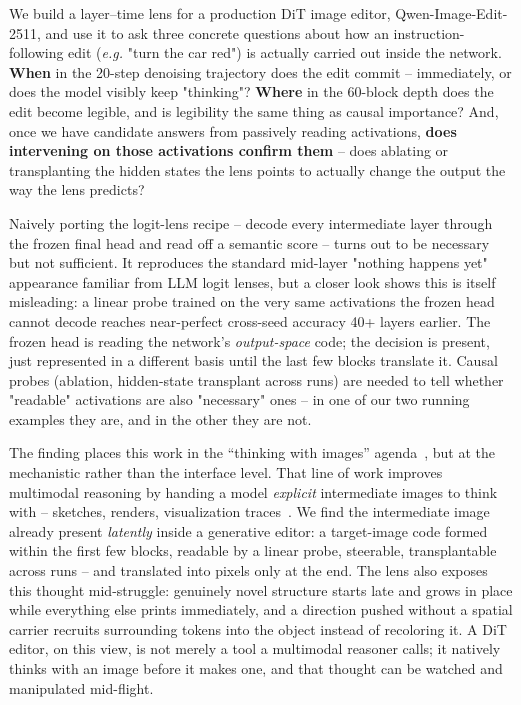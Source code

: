 \documentclass[10pt,twocolumn]{article}
\newcommand{\model}{Qwen-Image-Edit-2511}
\newcommand{\eg}{\emph{e.g.}}
\begin{document}
We build a layer--time lens for a production DiT image editor,
\model{}, and use it to ask three concrete questions about how an
instruction-following edit (\eg{} "turn the car red") is actually carried
out inside the network. \textbf{When} in the 20-step denoising trajectory
does the edit commit -- immediately, or does the model visibly keep
"thinking"? \textbf{Where} in the 60-block depth does the edit become
legible, and is legibility the same thing as causal importance?  And,
once we have candidate answers from passively reading activations,
\textbf{does intervening on those activations confirm them} -- does
ablating or transplanting the hidden states the lens points to actually
change the output the way the lens predicts?

Naively porting the logit-lens recipe -- decode every intermediate layer
through the frozen final head and read off a semantic score -- turns out
to be necessary but not sufficient. It reproduces the standard mid-layer
"nothing happens yet" appearance familiar from LLM logit lenses, but a
closer look shows this is itself misleading: a linear probe trained on
the very same activations the frozen head cannot decode reaches near-perfect
cross-seed accuracy 40+ layers earlier. The frozen head is reading the
network's \emph{output-space} code; the decision is present, just
represented in a different basis until the last few blocks translate it.
Causal probes (ablation, hidden-state transplant across runs) are needed
to tell whether "readable" activations are also "necessary" ones -- in
one of our two running examples they are, and in the other they are not.

The finding places this work in the ``thinking with
images'' agenda~\citep{su2025thinkingsurvey}, but at the mechanistic
rather than the interface level. That line of work improves multimodal
reasoning by handing a model \emph{explicit} intermediate images to
think with -- sketches, renders, visualization
traces~\citep{hu2024sketchpad,menon2024whiteboard,wu2024vot,li2025mvot,openai2025thinking}.
We find the intermediate image already present \emph{latently} inside a
generative editor: a target-image code formed within the first few
blocks, readable by a linear probe, steerable, transplantable across
runs -- and translated into pixels only at the end. The lens also
exposes this thought mid-struggle: genuinely novel structure starts
late and grows in place while everything else prints immediately, and a
direction pushed without a spatial carrier recruits surrounding tokens
into the object instead of recoloring it. A DiT editor, on this view,
is not merely a tool a multimodal reasoner calls; it natively thinks
with an image before it makes one, and that thought can be watched and
manipulated mid-flight.
\end{document}
